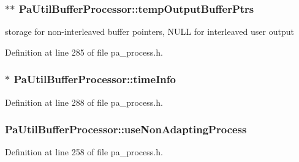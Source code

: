 \subsubsection[{\texorpdfstring{temp\+Output\+Buffer\+Ptrs}{tempOutputBufferPtrs}}]{$\ast$$\ast$ Pa\+Util\+Buffer\+Processor\+::temp\+Output\+Buffer\+Ptrs}\hypertarget{struct_pa_util_buffer_processor_a893544dc94d125b204167cf61f87ff9a}{}\label{struct_pa_util_buffer_processor_a893544dc94d125b204167cf61f87ff9a}
storage for non-\/interleaved buffer pointers, N\+U\+LL for interleaved user output 

Definition at line 285 of file pa\+\_\+process.\+h.

\subsubsection[{\texorpdfstring{time\+Info}{timeInfo}}]{$\ast$ Pa\+Util\+Buffer\+Processor\+::time\+Info}\hypertarget{struct_pa_util_buffer_processor_addae164599da4e3cad4498350cc9e39e}{}\label{struct_pa_util_buffer_processor_addae164599da4e3cad4498350cc9e39e}


Definition at line 288 of file pa\+\_\+process.\+h.

\subsubsection[{\texorpdfstring{use\+Non\+Adapting\+Process}{useNonAdaptingProcess}}]{ Pa\+Util\+Buffer\+Processor\+::use\+Non\+Adapting\+Process}\hypertarget{struct_pa_util_buffer_processor_a58c81d2f3c782274e0ab7ad6ab006034}{}\label{struct_pa_util_buffer_processor_a58c81d2f3c782274e0ab7ad6ab006034}


Definition at line 258 of file pa\+\_\+process.\+h.

